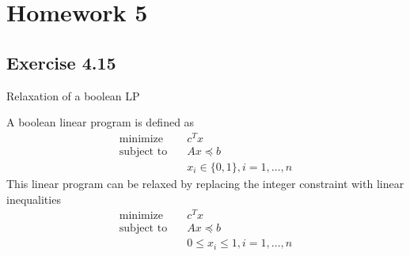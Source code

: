 \section{Homework 5}
\subsection{Exercise 4.15}

Relaxation of a boolean LP

A boolean linear program is defined as 
\begin{align}
  \text{minimize} & \quad c^T x \\
  \text{subject to} & \quad Ax \preceq b \\
  & \quad x_i \in \{ 0,1\}, i = 1, \dots, n 
\end{align}
This linear program can be relaxed by replacing the integer constraint with linear inequalities
\begin{align}
  \text{minimize} & \quad c^T x \\
  \text{subject to} & \quad Ax \preceq b \\
  & \quad 0 \leq x_i \leq 1, i = 1,\dots,n
\end{align} 
